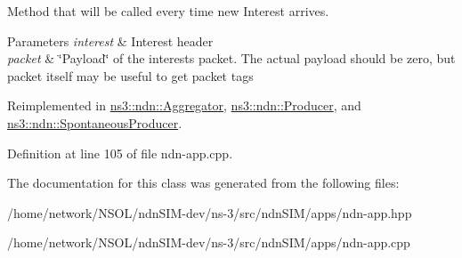 Method that will be called every time new Interest arrives. 


\begin{DoxyParams}{Parameters}
{\em interest} & Interest header \\
\hline
{\em packet} & \char`\"{}\+Payload\char`\"{} of the interests packet. The actual payload should be zero, but packet itself may be useful to get packet tags \\
\hline
\end{DoxyParams}


Reimplemented in \hyperlink{classns3_1_1ndn_1_1Aggregator_a80c9a59e3870a53e513fab803c342bb9}{ns3\+::ndn\+::\+Aggregator}, \hyperlink{classns3_1_1ndn_1_1Producer_aec531ffef54f9970c6d8cba664ef5107}{ns3\+::ndn\+::\+Producer}, and \hyperlink{classns3_1_1ndn_1_1SpontaneousProducer_a602d1c44a34c565b9f428bb5c25add4f}{ns3\+::ndn\+::\+Spontaneous\+Producer}.



Definition at line 105 of file ndn-\/app.\+cpp.



The documentation for this class was generated from the following files\+:\begin{DoxyCompactItemize}
\item 
/home/network/\+N\+S\+O\+L/ndn\+S\+I\+M-\/dev/ns-\/3/src/ndn\+S\+I\+M/apps/ndn-\/app.\+hpp\item 
/home/network/\+N\+S\+O\+L/ndn\+S\+I\+M-\/dev/ns-\/3/src/ndn\+S\+I\+M/apps/ndn-\/app.\+cpp\end{DoxyCompactItemize}

